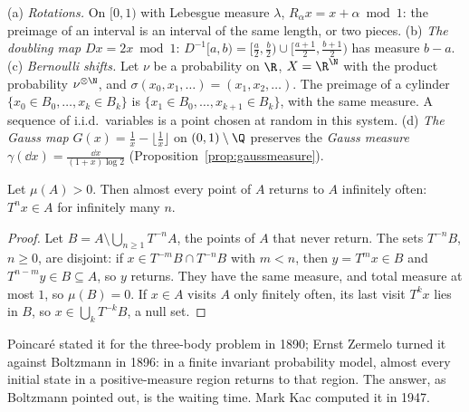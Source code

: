 \begin{example}\label{ex:mps}
(a) \emph{Rotations.} On $[0,1)$ with Lebesgue measure $\lambda$, $R_\alpha x=x+\alpha\bmod1$: the preimage of an interval is an interval of the same length, or two pieces.
(b) \emph{The doubling map} $Dx=2x\bmod1$: $D^{-1}[a,b)=[\frac a2,\frac b2)\cup[\frac{a+1}2,\frac{b+1}2)$ has measure $b-a$.
(c) \emph{Bernoulli shifts.} Let $\nu$ be a probability on $\R$, $X=\R^\N$ with the product probability $\nu^{\otimes\N}$, and $\sigma(x_0,x_1,\dots)=(x_1,x_2,\dots)$. The preimage of a cylinder $\{x_0\in B_0,\dots,x_k\in B_k\}$ is
$\{x_1\in B_0,\dots,x_{k+1}\in B_k\}$, with the same measure. A sequence of i.i.d.\ variables is a point chosen at random in this system.
(d) \emph{The Gauss map} $G(x)=\frac1x-\lfloor\frac1x\rfloor$ on $(0,1)\setminus\Q$ preserves the \emph{Gauss measure} $\gamma(\dd x)=\frac{\dd x}{(1+x)\log2}$ (Proposition~\ref{prop:gaussmeasure}).
\end{example}

\begin{theorem}\label{thm:poincare}
Let $\mu(A)>0$. Then almost every point of $A$ returns to $A$ infinitely often: $T^nx\in A$ for infinitely many $n$.
\end{theorem}
\begin{proof}
Let $B=A\setminus\bigcup_{n\ge1}T^{-n}A$, the points of $A$ that never return. The sets $T^{-n}B$, $n\ge0$, are disjoint: if $x\in T^{-m}B\cap T^{-n}B$ with $m<n$, then $y=T^mx\in B$ and $T^{n-m}y\in B\subseteq A$, so
$y$ returns. They have the same measure, and total measure at most $1$, so $\mu(B)=0$. If $x\in A$ visits $A$ only finitely often, its last visit $T^kx$ lies in $B$, so $x\in\bigcup_kT^{-k}B$, a null set.
\end{proof}

Poincar\'e stated it for the three-body problem in 1890; Ernst Zermelo turned it against Boltzmann in 1896: in a finite invariant probability model, almost every initial state in a positive-measure region returns to that region.
The answer, as Boltzmann pointed out, is the waiting time. Mark Kac computed it in 1947.

